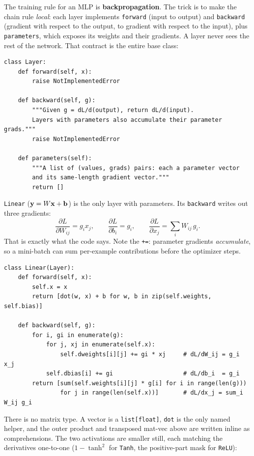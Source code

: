 The training rule for an MLP is \textbf{backpropagation}. The trick is
to make the chain rule \emph{local}: each layer implements
\texttt{forward} (input to output) and \texttt{backward} (gradient with
respect to the output, to gradient with respect to the input), plus
\texttt{parameters}, which exposes its weights and their gradients. A
layer never sees the rest of the network. That contract is the entire
base class:

\begin{lstlisting}
class Layer:
    def forward(self, x):
        raise NotImplementedError

    def backward(self, g):
        """Given g = dL/d(output), return dL/d(input).
        Layers with parameters also accumulate their parameter grads."""
        raise NotImplementedError

    def parameters(self):
        """A list of (values, grads) pairs: each a parameter vector
        and its same-length gradient vector."""
        return []
\end{lstlisting}

\texttt{Linear} ($\mathbf{y} = W\mathbf{x} + \mathbf{b}$) is the only layer with
parameters. Its \texttt{backward} writes out three gradients:
\begin{equation}\label{eq:linear-grads}
  \frac{\partial L}{\partial W_{ij}} = g_i x_j,
  \qquad
  \frac{\partial L}{\partial b_i} = g_i,
  \qquad
  \frac{\partial L}{\partial x_j} = \sum_i W_{ij}\, g_i.
\end{equation}
That is exactly what the code says. Note the \texttt{+=}: parameter
gradients \emph{accumulate}, so a mini-batch can sum per-example
contributions before the optimizer steps.

\begin{lstlisting}
class Linear(Layer):
    def forward(self, x):
        self.x = x
        return [dot(w, x) + b for w, b in zip(self.weights, self.bias)]

    def backward(self, g):
        for i, gi in enumerate(g):
            for j, xj in enumerate(self.x):
                self.dweights[i][j] += gi * xj     # dL/dW_ij = g_i x_j
            self.dbias[i] += gi                    # dL/db_i  = g_i
        return [sum(self.weights[i][j] * g[i] for i in range(len(g)))
                for j in range(len(self.x))]       # dL/dx_j = sum_i W_ij g_i
\end{lstlisting}

There is no matrix type. A vector is a \texttt{list[float]}, \texttt{dot}
is the only named helper, and the outer product and transposed mat-vec
above are written inline as comprehensions. The two activations are
smaller still, each matching the derivatives one-to-one ($1 - \tanh^2$
for \texttt{Tanh}, the positive-part mask for \texttt{ReLU}):

